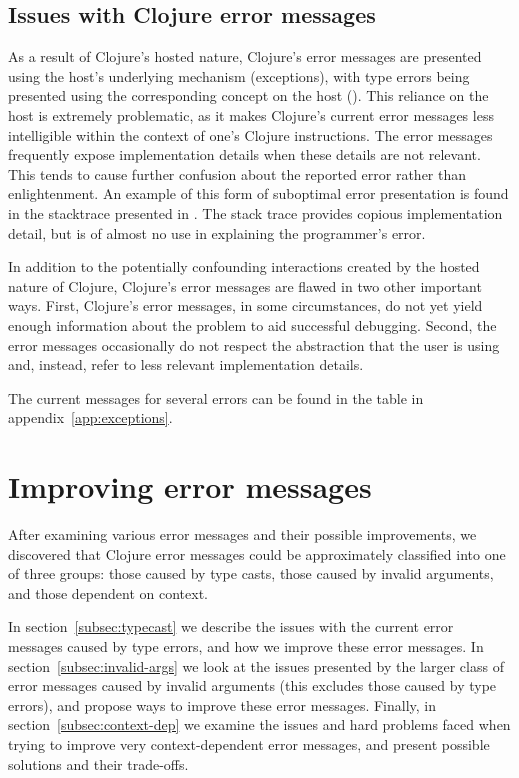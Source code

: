 \documentclass[12pt]{article}
\begin{document}
\subsection{Issues with Clojure error messages}
As a result of Clojure's hosted nature, Clojure's error messages are presented
using the host's underlying mechanism (exceptions), with type errors being
presented using the corresponding concept on the host (\cce). This reliance on
the host is extremely problematic, as it makes Clojure's current error messages less intelligible within the context of one's Clojure instructions. The error
messages frequently expose implementation details when these details are not
relevant. This tends to cause further confusion about the reported error rather than
enlightenment. An example of this form of suboptimal error presentation is found in the stacktrace presented in \cite{goncalves:clojure}. The stack trace provides copious implementation detail, but is of almost no use in explaining the programmer's error.

In addition to the potentially confounding interactions created by the hosted nature of Clojure, Clojure's
error messages are flawed in two other important ways. First, Clojure's error messages, in some circumstances, do not yet
yield enough information about the problem to aid successful debugging. Second,
the error messages occasionally do not respect the abstraction that the user is
using and, instead, refer to less relevant implementation details.

The current messages for several errors can be found in the table in
appendix~\ref{app:exceptions}.

\section{Improving error messages}
After examining various error messages and their possible improvements, we
discovered that Clojure error messages could be approximately classified into one of
three groups: those caused by type casts, those caused by invalid arguments, and those dependent on context.

In section~\ref{subsec:typecast} we describe the issues with the current error
messages caused by type errors, and how we improve these error
messages. 
In section~\ref{subsec:invalid-args} we look at the issues presented by
the larger class of error messages caused by invalid arguments (this excludes
those caused by type errors), and propose ways to improve these error 
messages. Finally, in section~\ref{subsec:context-dep} we examine the issues
and hard problems faced when trying to improve very context-dependent error
messages, and present possible solutions and
their trade-offs.
\end{document}
